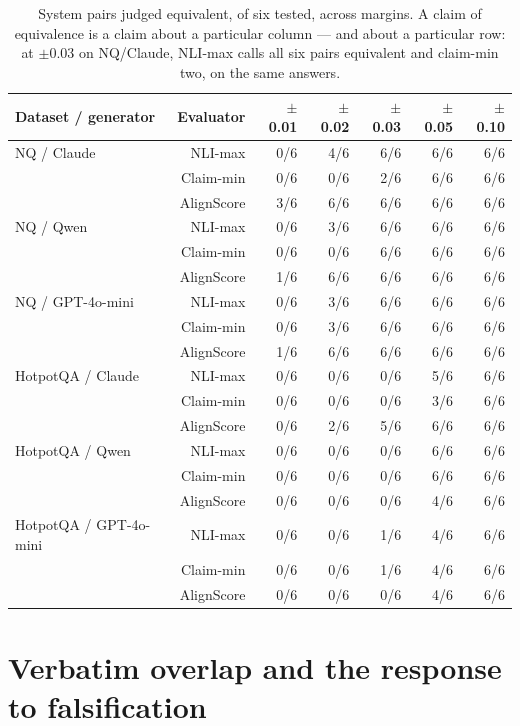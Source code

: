 \documentclass[11pt]{article}
\begin{document}
\begin{table}[t]
\centering
\small
\begin{tabular}{lrrrrrr}
\toprule
\textbf{Dataset / generator} & \textbf{Evaluator} & \textbf{$\pm$0.01} & \textbf{$\pm$0.02} & \textbf{$\pm$0.03} & \textbf{$\pm$0.05} & \textbf{$\pm$0.10} \\
\midrule
NQ / Claude & NLI-max & 0/6 & 4/6 & 6/6 & 6/6 & 6/6 \\
 & Claim-min & 0/6 & 0/6 & 2/6 & 6/6 & 6/6 \\
 & AlignScore & 3/6 & 6/6 & 6/6 & 6/6 & 6/6 \\
NQ / Qwen & NLI-max & 0/6 & 3/6 & 6/6 & 6/6 & 6/6 \\
 & Claim-min & 0/6 & 0/6 & 6/6 & 6/6 & 6/6 \\
 & AlignScore & 1/6 & 6/6 & 6/6 & 6/6 & 6/6 \\
NQ / GPT-4o-mini & NLI-max & 0/6 & 3/6 & 6/6 & 6/6 & 6/6 \\
 & Claim-min & 0/6 & 3/6 & 6/6 & 6/6 & 6/6 \\
 & AlignScore & 1/6 & 6/6 & 6/6 & 6/6 & 6/6 \\
\midrule
HotpotQA / Claude & NLI-max & 0/6 & 0/6 & 0/6 & 5/6 & 6/6 \\
 & Claim-min & 0/6 & 0/6 & 0/6 & 3/6 & 6/6 \\
 & AlignScore & 0/6 & 2/6 & 5/6 & 6/6 & 6/6 \\
HotpotQA / Qwen & NLI-max & 0/6 & 0/6 & 0/6 & 6/6 & 6/6 \\
 & Claim-min & 0/6 & 0/6 & 0/6 & 6/6 & 6/6 \\
 & AlignScore & 0/6 & 0/6 & 0/6 & 4/6 & 6/6 \\
HotpotQA / GPT-4o-mini & NLI-max & 0/6 & 0/6 & 1/6 & 4/6 & 6/6 \\
 & Claim-min & 0/6 & 0/6 & 1/6 & 4/6 & 6/6 \\
 & AlignScore & 0/6 & 0/6 & 0/6 & 4/6 & 6/6 \\
\bottomrule
\end{tabular}
\caption{System pairs judged equivalent, of six tested, across margins. A claim of equivalence is a claim about a particular column --- and about a particular row: at $\pm$0.03 on NQ/Claude, NLI-max calls all six pairs equivalent and claim-min two, on the same answers.}
\label{tab:9}
\end{table}

\section{Verbatim overlap and the response to falsification}
\label{app:copying}
\end{document}

